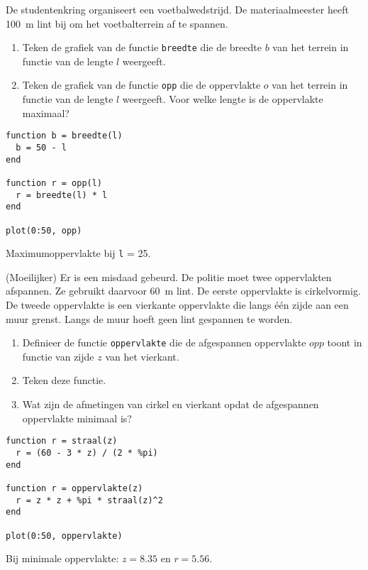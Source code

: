 \begin{oef}
De studentenkring organiseert een voetbalwedstrijd. De materiaalmeester heeft \SI{100}{\meter} lint bij om het voetbalterrein af te spannen. 
\begin{enumerate}
\item Teken de grafiek van de functie \verb/breedte/ die de breedte $b$ van het terrein in functie van de lengte $l$ weergeeft.
\item Teken de grafiek van de functie \verb/opp/ die de oppervlakte $o$ van het terrein in functie van de lengte $l$ weergeeft. Voor welke lengte is de oppervlakte maximaal?
\end{enumerate}
\begin{opl}
\begin{lstlisting}
function b = breedte(l)
  b = 50 - l
end

function r = opp(l)
  r = breedte(l) * l
end

plot(0:50, opp)
\end{lstlisting}
Maximumoppervlakte bij \verb'l' = 25.
\end{opl}
\end{oef}

\begin{oef}
(Moeilijker) Er is een misdaad gebeurd. De politie moet twee oppervlakten afspannen. Ze gebruikt daarvoor \SI{60}{\meter} lint. De eerste oppervlakte is cirkelvormig. De tweede oppervlakte is een vierkante oppervlakte die langs \'e\'en zijde aan een muur grenst. Langs de muur hoeft geen lint gespannen te worden. 
\begin{enumerate}
\item Definieer de functie \verb/oppervlakte/ die de afgespannen oppervlakte $opp$ toont in functie van zijde $z$ van het vierkant.
\item Teken deze functie.
\item Wat zijn de afmetingen van cirkel en vierkant opdat de afgespannen oppervlakte minimaal is?
\end{enumerate}
\begin{opl}
\begin{lstlisting}
function r = straal(z)
  r = (60 - 3 * z) / (2 * %pi)
end

function r = oppervlakte(z)
  r = z * z + %pi * straal(z)^2
end

plot(0:50, oppervlakte)
\end{lstlisting}
Bij minimale oppervlakte: $z = 8.35$ en $r = 5.56$.
\end{opl}
\end{oef}

